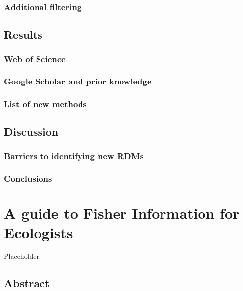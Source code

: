 \documentclass[12pt,twoside,openany]{reedthesis}
\begin{document}
\subsection{Additional filtering}\label{additional-filtering}

\section{Results}\label{results}

\subsection{Web of Science}\label{web-of-science-1}

\subsection{Google Scholar and prior
knowledge}\label{google-scholar-and-prior-knowledge}

\subsection{List of new methods}\label{list-of-new-methods}

\section{Discussion}\label{discussion}

\subsection{Barriers to identifying new
RDMs}\label{barriers-to-identifying-new-rdms}

\subsection{Conclusions}\label{conclusions}

\chapter{A guide to Fisher Information for Ecologists}\label{fiGuide}

Placeholder

\section{Abstract}\label{abstract}
\end{document}
